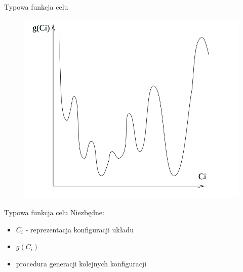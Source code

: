 
	\begin{frame}{Typowa funkcja celu}
		\begin{figure}
			\includegraphics[height=0.9\textheight]{img/18/target_fun}
		\end{figure}
	\end{frame}


	\begin{frame}{Typowa funkcja celu}
		Niezbędne:
		\begin{itemize}
			\item $C_i$ - reprezentacja konfiguracji układu
			\item $g(C_i)$
			\item procedura generacji kolejnych konfiguracji
		\end{itemize}
	\end{frame}


